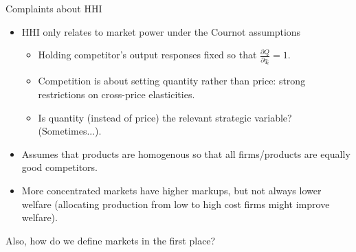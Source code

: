 \begin{frame}{Complaints about HHI}
\begin{itemize}
\item HHI only relates to market power under the Cournot assumptions
\begin{itemize}
\item Holding competitor's output responses fixed so that $\frac{\partial Q}{\partial q_i} =1$.
\item Competition is about setting quantity rather than price: strong restrictions on cross-price elasticities.
\item Is quantity (instead of price) the relevant strategic variable? (Sometimes...).
\end{itemize}
\item Assumes that products are \alert{homogenous} so that all firms/products are equally good competitors.
\item More concentrated markets have higher markups, but not always lower welfare (allocating production from low to high cost firms might improve welfare).
\end{itemize}
Also, how do we \alert{define markets} in the first place?
\end{frame}

















































